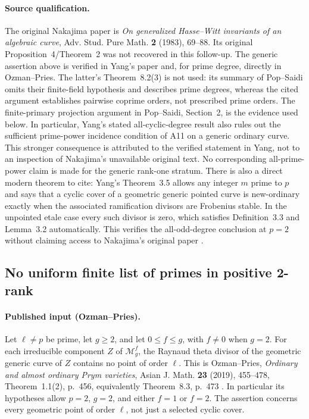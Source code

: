 \documentclass[11pt,a4paper]{article}
\begin{document}
\paragraph{Source qualification.}
The original Nakajima paper is \emph{On generalized Hasse--Witt
invariants of an algebraic curve}, Adv. Stud. Pure Math.
\textbf{2} (1983), 69--88. Its original Proposition~4/Theorem~2 was
not recovered in this follow-up. The generic assertion above is
verified in Yang's paper and, for prime degree, directly in
Ozman--Pries. The latter's Theorem~8.2(3) is not used: its summary of
Pop--Saidi omits their finite-field hypothesis and describes prime
degrees, whereas the cited argument establishes pairwise coprime
orders, not prescribed prime orders. The finite-primary projection
argument in Pop--Saidi, Section~2, is the evidence used below.
\cite[Propositions~2.1,2.3 and their proofs, pp.~112--114]{PopSaidi}
In particular, Yang's stated all-cyclic-degree result also rules
out the sufficient prime-power incidence condition of A11 on a
generic ordinary curve. This stronger consequence is attributed to
the verified statement in Yang, not to an inspection of Nakajima's
unavailable original text. No corresponding all-prime-power claim
is made for the generic rank-one stratum.
There is also a direct modern theorem to cite: Yang's
Theorem~3.5 allows any integer $m$ prime to $p$ and says that a
cyclic cover of a geometric generic pointed curve is new-ordinary
exactly when the associated ramification divisors are Frobenius
stable. In the unpointed etale case every such divisor is zero,
which satisfies Definition~3.3 and Lemma~3.2 automatically.
This verifies the all-odd-degree conclusion at $p=2$ without
claiming access to Nakajima's original paper
\cite[Definition~3.3, Theorem~3.5]{Yang2021}.



\subsection{No uniform finite list of primes in positive 2-rank}
\label{sec:finite-prime-avoidance}

\paragraph{Published input (Ozman--Pries).}
Let $\ell\ne p$ be prime, let $g\ge2$, and let $0\le f\le g$, with
$f\ne0$ when $g=2$.  For each irreducible component $Z$ of
$\mathcal M_g^f$, the Raynaud theta divisor of the geometric generic
curve of $Z$ contains no point of order $\ell$.  This is
Ozman--Pries, \emph{Ordinary and almost ordinary Prym varieties},
Asian J. Math. \textbf{23} (2019), 455--478,
Theorem~1.1(2), p.~456, equivalently Theorem~8.3, p.~473 \cite{OzmanPries2019}.
In particular its hypotheses allow $p=2$, $g=2$, and either $f=1$ or
$f=2$.  The assertion concerns every geometric point of order $\ell$,
not just a selected cyclic cover.
\end{document}
